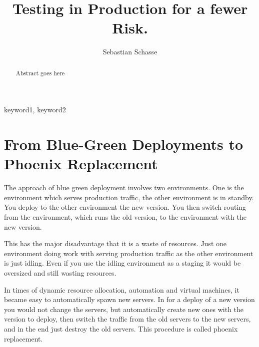 \documentclass[runningheads,a4paper]{llncs}
\begin{document}
\title{Testing in Production for a fewer Risk.}

\author{Sebastian Schasse}

%
\iffalse
\author{Firstname Lastname\inst{1} \and Firstname Lastname\inst{2} }

\institute{
Insitute 1\\
\email{...}\and
Insitute 2\\
\email{...}
}
\fi

\maketitle

\begin{abstract}
Abstract goes here
\end{abstract}

\begin{keywords}
keyword1, keyword2
\end{keywords}

\section{From Blue-Green Deployments to Phoenix Replacement}

The approach of blue green deployment involves two environments. One
is the environment which serves production traffic, the other
environment is in standby. You deploy to the other environment the new
version. You then switch routing from the environment, which runs the old
version, to the environment with the new version.

This has the major disadvantage that it is a waste of resources. Just
one environment doing work with serving production traffic as the
other environment is just idling. Even if you use the idling
environment as a staging it would be oversized and still wasting
resources.

In times of dynamic resource allocation, automation and virtual
machines, it became easy to automatically spawn new servers. In for a
deploy of a new version you would not change the servers, but
automatically create new ones with the version to deploy, then switch
the traffic from the old servers to the new servers, and in the end
just destroy the old servers. This procedure is called phoenix
replacement.
\end{document}

